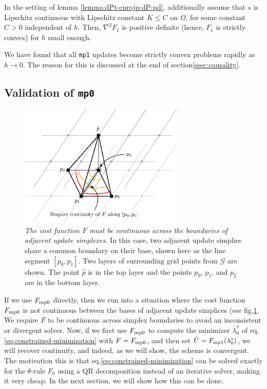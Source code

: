 \documentclass[smallcondensed]{svjour3}
\begin{document}
\begin{lemma}\label{lemma:F-strictly-convex}
  In the setting of lemma \ref{lemma:dPt-cprojp-dP-pd}, additionally
  assume that $s$ is Lipschitz continuous with Lipschitz constant
  $K \leq C$ on $\Omega$, for some constant $C > 0$ independent of
  $h$. Then, $\nabla^2 F_1$ is positive definite (hence, $F_1$ is
  strictly convex) for $h$ small enough.
\end{lemma}

We have found that all \texttt{mp1} updates become strictly convex
problems rapidly as $h \to 0$. The reason for this is discussed at the
end of section\@ \ref{ssec:causality}.

\subsection{Validation of \texttt{mp0}}\label{ssec:validation}

\begin{figure}
  \centering
  \includegraphics[width=0.7\textwidth]{continuity.eps}
  \caption{\emph{The cost function $F$ must be continuous across the
      boundaries of adjacent update simplexes.} In this case, two
    adjacent update simplies share a common boundary on their base,
    shown here as the line segment $[p_0, p_1]$. Two layers of
    surrounding grid points from $\mathcal{G}$ are shown. The point
    $\hat{p}$ is in the top layer and the points $p_0$, $p_1$, and
    $p_2$ are in the bottom layer.}\label{fig:continuity}
\end{figure}

If we use $F_{\operatorname{mp0}}$ directly, then we run into a situation where the
cost function $F_{\operatorname{mp0}}$ is not continuous between the bases of
adjacent update simplices (see fig.\@ \ref{fig:continuity}. We require
$F$ to be continuous across simplex boundaries to avoid an
inconsistent or divergent solver. Now, if we first use $F_{\operatorname{mp0}}$ to
compute the minimizer $\lambda_0^*$ of eq.\@
\ref{eq:constrained-minimization} with $F = F_{\operatorname{mp0}}$, and then set
$\hat{U} = F_{\operatorname{mp1}}(\lambda_0^*)$, we will recover continuity, and
indeed, as we will show, the scheme is convergent. The motivation this
is that eq.\@ \ref{eq:constrained-minimization} can be solved exactly
for the $\theta$-rule $F_0$ using a QR decomposition instead of an
iterative solver, making it very cheap. In the next section, we will
show how this can be done.
\end{document}
